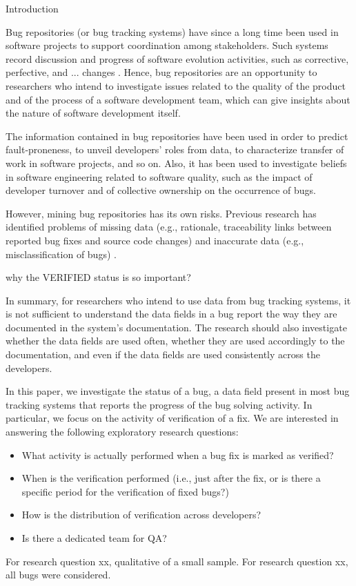 \begin{section}{Introduction}

Bug repositories (or bug tracking systems) have since a long time been used in software projects to support coordination among stakeholders. Such systems record discussion and progress of software evolution activities, such as corrective, perfective, and ... changes \cite{Antoniol2008}. Hence, bug repositories are an opportunity to researchers who intend to investigate issues related to the quality of the product and of the process of a software development team, which can give insights about the nature of software development itself.

The information contained in bug repositories have been used in order to predict fault-proneness, to unveil developers' roles from data, to characterize transfer of work in software projects, and so on. Also, it has been used to investigate beliefs in software engineering related to software quality, such as the impact of developer turnover and of collective ownership on the occurrence of bugs.

However, mining bug repositories has its own risks. Previous research has identified problems of missing data (e.g., rationale, traceability links between reported bug fixes and source code changes) and inaccurate data (e.g., misclassification of bugs) \cite{Aranda2009,Bird2009,Nguyen2010,Ayari2007}.

\TODO why the VERIFIED status is so important?

In summary, for researchers who intend to use data from bug tracking systems, it is not sufficient to understand the data fields in a bug report the way they are documented in the system's documentation. The research should also investigate whether the data fields are used often, whether they are used accordingly to the documentation, and even if the data fields are used consistently across the developers.

In this paper, we investigate the status of a bug, a data field present in most bug tracking systems that reports the progress of the bug solving activity. In particular, we focus on the activity of verification of a fix. We are interested in answering the following exploratory research questions:

\begin{itemize}
	\item What activity is actually performed when a bug fix is marked as verified?
	\item When is the verification performed (i.e., just after the fix, or is there a specific period for the verification of fixed bugs?)
	\item How is the distribution of verification across developers?
	\item Is there a dedicated team for QA?
\end{itemize}

For research question xx, qualitative of a small sample. 
For research question xx, all bugs were considered.

\end{section}

